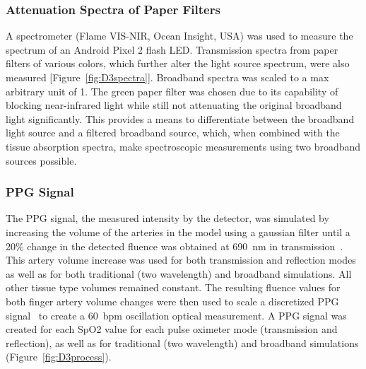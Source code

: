         \subsubsection{Attenuation Spectra of Paper Filters}
        A spectrometer (Flame VIS-NIR, Ocean Insight, USA) was used to measure the spectrum of an Android Pixel 2 flash LED. Transmission spectra from paper filters of various colors, which further alter the light source spectrum, were also measured [Figure~\ref{fig:D3spectra}]. Broadband spectra was scaled to a max arbitrary unit of 1. The green paper filter was chosen due to its capability of blocking near-infrared light while still not attenuating the original broadband light significantly. This provides a means to differentiate between the broadband light source and a filtered broadband source, which, when combined with the tissue absorption spectra, make spectroscopic measurements using two broadband sources possible. 
        
        \subsubsection{PPG Signal}
        The PPG signal, the measured intensity by the detector, was simulated by increasing the volume of the arteries in the model using a gaussian filter until a 20\% change in the detected fluence was obtained at 690~nm in transmission~\cite{Hertzman1938}. This artery volume increase was used for both transmission and reflection modes as well as for both traditional (two wavelength) and broadband simulations. All other tissue type volumes remained constant. The resulting fluence values for both finger artery volume changes were then used to scale a discretized PPG signal~\cite{Elgendi2012} to create a 60~bpm oscillation optical measurement. A PPG signal was created for each SpO2 value for each pulse oximeter mode (transmission and reflection), as well as for traditional (two wavelength) and broadband simulations (Figure~\ref{fig:D3process}). 
        
